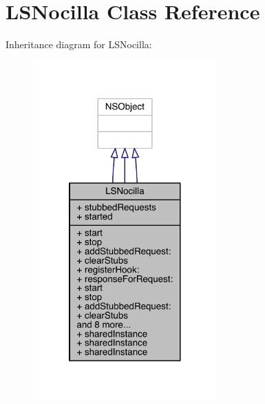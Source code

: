 \hypertarget{interface_l_s_nocilla}{\section{L\-S\-Nocilla Class Reference}
\label{interface_l_s_nocilla}
}


Inheritance diagram for L\-S\-Nocilla\-:\nopagebreak
\begin{figure}[H]
\begin{center}
\leavevmode
\includegraphics[width=200pt]{interface_l_s_nocilla__inherit__graph}
\end{center}
\end{figure}


